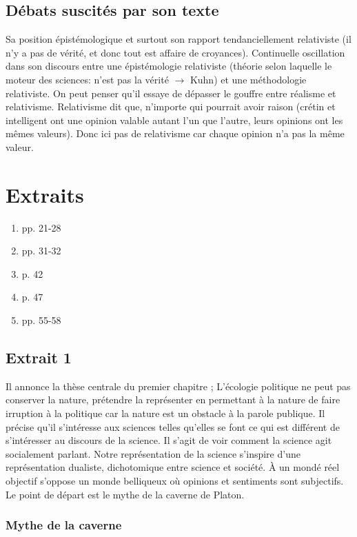 \subsection{Débats suscités par son texte}
Sa position épistémologique et surtout son rapport tendanciellement relativiste (il n'y a pas de vérité, et donc tout est affaire de croyances).
Continuelle oscillation dans son discours entre une épistémologie relativiste (théorie selon laquelle le moteur des sciences: n'est pas la vérité $\rightarrow$ Kuhn) et une méthodologie relativiste.
On peut penser qu'il essaye de dépasser le gouffre entre réalisme et relativisme.
Relativisme dit que, n'importe qui pourrait avoir raison (crétin et intelligent ont une opinion valable autant l'un que l'autre, leurs opinions ont les mêmes valeurs).
Donc ici pas de relativisme car chaque opinion n'a pas la même valeur.

\section{Extraits}
\begin{enumerate}
	\item pp. 21-28
	\item pp. 31-32
	\item p. 42
	\item p. 47
	\item pp. 55-58
\end{enumerate}

\subsection{Extrait 1}
Il annonce la thèse centrale du premier chapitre ; L'écologie politique ne peut pas conserver la nature, prétendre la représenter en permettant à la nature de faire irruption à la politique car la nature est un obstacle à la parole publique.
Il précise qu'il s'intéresse aux sciences telles qu'elles se font ce qui est différent de s'intéresser au discours de la science.
Il s'agit de voir comment la science agit socialement parlant.
Notre représentation  de la science s'inspire d'une représentation dualiste, dichotomique entre science et société.
À un mondé réel objectif s'oppose un monde belliqueux où  opinions et sentiments sont subjectifs.
Le point de départ est le mythe de la caverne de Platon.

\subsubsection{Mythe de la caverne}

